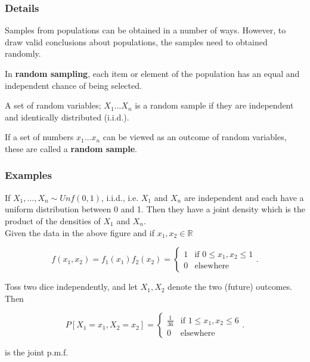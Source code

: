 \documentclass[12pt,a4paper]{article}
\theoremstyle{regla}
\theoremstyle{remark}
\theoremstyle{definition}
\theoremstyle{nonumberbreak}
\begin{document}
\subsubsection{Details}
Samples from populations can be obtained in a number of ways. However, to draw valid conclusions about populations, the samples need to obtained randomly.
\begin{defn}
In {\bf random sampling}, each item or element of the population has an equal and independent chance of being selected.
\end{defn}
A set of random variables; $X_1 \ldots X_n$ is a random sample if they are independent and identically distributed (i.i.d.).
\begin{defn}
If a set of numbers $x_1 \ldots x_n$ can be viewed as an outcome of random variables, these are called a {\bf random sample}.
\end{defn}
\subsubsection{Examples}
\begin{xmpl}

If $X_1, \ldots, X_n  \sim Unf(0,1)$, i.i.d., i.e.  $X_1$ and $X_n$ are independent and each have a uniform distribution between 0 and 1. Then they have a joint density which is the product of the densities of $X_1$ and $X_n$.\\

Given the data in the above figure and if  $x_1 , x_2 \in \mathbb{R}$

$$
f(x_1, x_2) = f_1(x_1) f_2(x_2) =
\begin{cases}
  1 & \text{if } 0 \leq x_1, x_2 \leq 1 \\
  0 & \text{elsewhere}
\end{cases}.
$$

\end{xmpl}
\begin{xmpl}

 Toss two dice independently, and let $X_1, X_2$ denote the two (future) outcomes.\\

Then 


$$
 P[X_1 = x_1, X_2 =  x_2]=
 \begin{cases}
  \frac{1}{36} & \text{if } 1 \leq x_1, x_2 \leq 6 \\
  0 & \text{elsewhere}
\end{cases}.
$$

is the joint p.m.f.

\end{xmpl}
\end{document}
